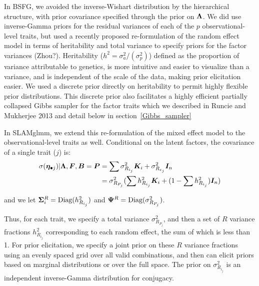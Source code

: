 \documentclass[11pt]{amsart}
\newcommand*{\B}[1]{\ifmmode\bm{#1}\else\textbf{#1}\fi}
\begin{document}
In BSFG, we avoided the inverse-Wishart distribution by the hierarchical structure, with prior covariance specified through the prior on $\B{\Lambda}$. We did use inverse-Gamma priors for the residual variances of each of the $p$ observational-level traits, but used a recently proposed re-formulation of the random effect model in terms of heritability and total variance to specify priors for the factor variances (Zhou?). Heritability ($h^2 = \sigma^2_a / (\sigma^2_p)$) defined as the proportion of variance attributable to genetics, is more intuitive and easier to visualize than a variance, and is independent of the scale of the data, making prior elicitation easier. We used a discrete prior directly on heritability to permit highly flexible prior distributions. This discrete prior also facilitates a highly efficient partially collapsed Gibbs sampler for the factor traits which we described in Runcie and Mukherjee 2013 and detail below in section~\ref{Gibbs_sampler}


In SLAMglmm, we extend this re-formulation of the mixed effect model to the observational-level traits as well. Conditional on the latent factors, the covariance of a single trait ($j$) is:
\begin{align} \begin{split}
\sigma(\B{\eta}_{\bullet j}) | \B{\Lambda}, \B{F}, \B{B} = \B{P} &= \sum \sigma^2_{R_{i_j}} \B{K}_i + \sigma^2_{R_{e_j}}\B{I}_n \\
&= \sigma^2_{R_{P_j}} (\sum h^2_{R_{i_j}} \B{K}_i + (1 - \sum h^2_{R_{i_j}})\B{I}_n) 
\end{split} \end{align}

\noindent and we let $\B{\Sigma}^R_i = \mbox{Diag}(h^2_{R_{i_j}})$ and $\B{\Psi}^R = \mbox{Diag}(\sigma^2_{R_{P_j}})$.

Thus, for each trait, we specify a total variance $\sigma^2_{R_{P_j}}$, and then a set of $R$ variance fractions $h^2_{R_{i_j}}$ corresponding to each random effect, the sum of which is less than 1. For prior elicitation, we specify a joint prior on these $R$ variance fractions using an evenly spaced grid over all valid combinations, and then can elicit priors based on marginal distributions or over the full space. The prior on $\sigma^2_{R_{i_j}}$ is an independent inverse-Gamma distribution for conjugacy. 
\end{document}
